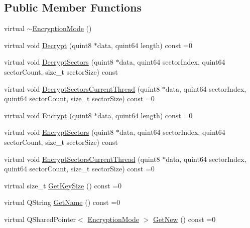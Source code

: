 \subsection*{Public Member Functions}
\begin{DoxyCompactItemize}
\item 
virtual \hyperlink{class_gost_crypt_1_1_volume_1_1_encryption_mode_a7c290cfb3cf81fb3642ae1053f001f77}{$\sim$\+Encryption\+Mode} ()
\item 
virtual void \hyperlink{class_gost_crypt_1_1_volume_1_1_encryption_mode_a78203c16b84218aa0e43f7512650cc71}{Decrypt} (quint8 $\ast$data, quint64 length) const =0
\item 
virtual void \hyperlink{class_gost_crypt_1_1_volume_1_1_encryption_mode_ad25173c1eb3d2bf644cb98ff037f1e23}{Decrypt\+Sectors} (quint8 $\ast$data, quint64 sector\+Index, quint64 sector\+Count, size\+\_\+t sector\+Size) const
\item 
virtual void \hyperlink{class_gost_crypt_1_1_volume_1_1_encryption_mode_ac0aff16d606ff0097344d0af157cb8f5}{Decrypt\+Sectors\+Current\+Thread} (quint8 $\ast$data, quint64 sector\+Index, quint64 sector\+Count, size\+\_\+t sector\+Size) const =0
\item 
virtual void \hyperlink{class_gost_crypt_1_1_volume_1_1_encryption_mode_a1ad315d9067c222eb693e2ea0e06343e}{Encrypt} (quint8 $\ast$data, quint64 length) const =0
\item 
virtual void \hyperlink{class_gost_crypt_1_1_volume_1_1_encryption_mode_a30755acb23df4d96930d7ac07760eab6}{Encrypt\+Sectors} (quint8 $\ast$data, quint64 sector\+Index, quint64 sector\+Count, size\+\_\+t sector\+Size) const
\item 
virtual void \hyperlink{class_gost_crypt_1_1_volume_1_1_encryption_mode_a2b6d85199f01ab2055476d62d49d99e1}{Encrypt\+Sectors\+Current\+Thread} (quint8 $\ast$data, quint64 sector\+Index, quint64 sector\+Count, size\+\_\+t sector\+Size) const =0
\item 
virtual size\+\_\+t \hyperlink{class_gost_crypt_1_1_volume_1_1_encryption_mode_a2879197c50f2e834f22d87def6c3ec0f}{Get\+Key\+Size} () const =0
\item 
virtual Q\+String \hyperlink{class_gost_crypt_1_1_volume_1_1_encryption_mode_a8b82c75eb29a3149b1dd171624c3ede1}{Get\+Name} () const =0
\item 
virtual Q\+Shared\+Pointer$<$ \hyperlink{class_gost_crypt_1_1_volume_1_1_encryption_mode}{Encryption\+Mode} $>$ \hyperlink{class_gost_crypt_1_1_volume_1_1_encryption_mode_ae64e9d022e271f747376c9db2aaad1b4}{Get\+New} () const =0

\end{DoxyCompactItemize}

